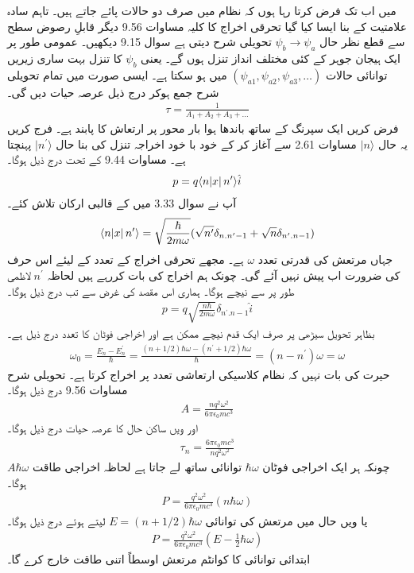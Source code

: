 میں اب تک فرض کرتا رہا ہوں کہ نظام میں صرف دو حالات پائے جاتے ہیں۔ تاہم سادہ علامتیت کے بنا ایسا کیا گیا تحرقی اخراج کا کلیہ مساوات \num{9.56} دیگر قابلِ رصوض سطح سے قطع نظر حال \(\psi_b \rightarrow \psi_a\) تحویلی شرح دیتی ہے سوال \num{9.15} دیکھیں۔ عمومی طور پر ایک ہیجان جوہر کے کئی مختلف انداز تنزل ہوں گے۔ یعنی \(\psi_b\) کا تنزل بہت ساری زیریں توانائی حالات \((\psi_{a1}, \psi_{a2}, \psi_{a3}, \dots)\) میں ہو سکتا ہے۔ ایسی صورت میں تمام تحویلی شرح جمع ہوکر درج ذیل عرصہ حیات دیں گی۔
\begin{align}
	\tau = \frac{1}{A_1+A_2+A_3+\dots}
\end{align}
فرض کریں ایک سپرنگ کے ساتھ باندھا ہوا بار  محور  پر ارتعاش کا پابند ہے۔ فرج کریں یہ حال \(\mid n \rangle\) مساوات \num{2.61} سے آغاز کر کے خود با خود اخراجہ تنزل کی بنا حال \(\mid n^\prime \rangle\) پہنچتا ہے۔ مساوات  \num{9.44} کے تحت درج ذیل ہوگا۔
\begin{align*}
	p = q\langle n\abs{x}n^\prime\rangle\hat{i}
\end{align*}
آپ نے سوال \num{3.33} میں  کے قالبی ارکان تلاش کئے۔
\begin{align*}
	\langle n\abs{x}n^\prime\rangle = \sqrt{\frac{\hbar}{2m\omega}}(\sqrt{n^\prime}\delta_{n.n^\prime-1}+\sqrt{n}\delta_{n^\prime.n-1})
\end{align*}
جہاں مرتعش کی قدرتی تعدد \(\omega\) ہے۔ مجھے تحرقی اخراج کے تعدد کے لیئے اس حرف کی ضرورت اب پیش نہیں آئے گی۔ چونک ہم اخراج کی بات کررہے ہیں لحاظہ \(n^\prime\) لاظمی طور پر  سے نیچے ہوگا۔ ہماری اس مقصد کی غرض سے تب درج ذیل ہوگا۔
\begin{align}
	p = q\sqrt{\frac{n\hbar}{2m\omega}}\delta_{n^\prime.n-1}\hat{i}
\end{align}
بظاہر تحویل سیڑھی پر صرف ایک قدم نیچے ممکن ہے اور اخراجی فوٹان کا تعدد درج ذیل ہے۔
\begin{align}
	\omega_0 = \frac{E_n-E_n^\prime}{\hbar} = \frac{(n+1/2)\hbar\omega - (n^\prime + 1/2)\hbar\omega}{\hbar} =(n-n^\prime)\omega = \omega
\end{align}
حیرت کی بات نہیں کہ نظام کلاسیکی ارتعاشی تعدد پر اخراج کرتا ہے۔ تحویلی شرح مساوات \num{9.56} درج ذیل ہوگا۔
\begin{align}
	A = \frac{nq^2\omega^2}{6\pi\epsilon_0mc^3}
\end{align}
اور ویں ساکن حال کا عرصہ حیات درج ذیل ہوگا۔
\begin{align}
	\tau_n = \frac{6\pi\epsilon_0mc^3}{nq^2\omega^2}
\end{align}
چونکہ ہر ایک اخراجی فوٹان \(\hbar\omega\) توانائی ساتھ لے جاتا ہے لحاظہ اخراجی طاقت \(A\hbar\omega\) ہوگا۔
\begin{align*}
	P = \frac{q^2\omega^2}{6\pi\epsilon_0mc^3}(n\hbar\omega)
\end{align*}
یا ویں حال میں مرتعش کی توانائی \(E = (n+1/2)\hbar\omega\) لیتے ہوئے درج ذیل ہوگا۔
\begin{align}
	P = \frac{q^2\omega^2}{6\pi\epsilon_0mc^3}(E-\frac{1}{2}\hbar\omega)
\end{align}
ابتدائی توانائی  کا کوانٹم مرتعش اوسطاً اتنی طاقت خارج کرے گا۔

